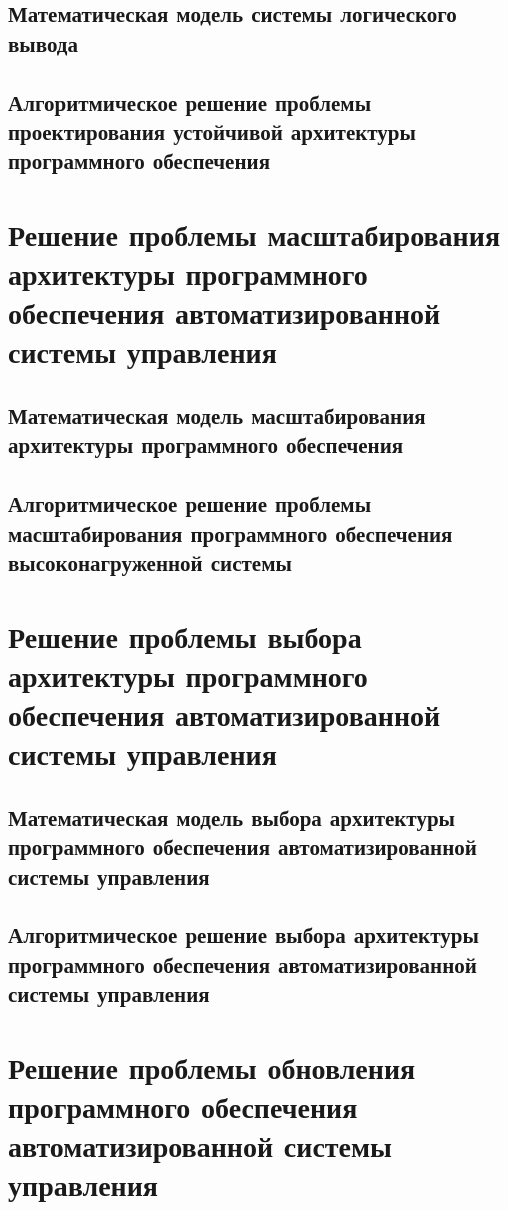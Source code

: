 
\subsection{Математическая модель системы логического вывода}\label{sec:ch2/sec3/sub1}

\subsection{Алгоритмическое решение проблемы проектирования устойчивой архитектуры программного обеспечения}\label{sec:ch2/sec3/sub2}
\section{Решение проблемы масштабирования архитектуры программного обеспечения автоматизированной системы управления}\label{sec:ch2/sec4}
\subsection{Математическая модель масштабирования архитектуры программного обеспечения}\label{sec:ch2/sec4/sub1}
\subsection{Алгоритмическое решение проблемы масштабирования программного обеспечения высоконагруженной системы}\label{sec:ch2/sec4/sub2}
\section{Решение проблемы выбора архитектуры программного обеспечения автоматизированной системы управления}\label{sec:ch2/sec5}
\subsection{Математическая модель выбора архитектуры программного обеспечения автоматизированной системы управления}\label{sec:ch2/sec5/sub1}
\subsection{Алгоритмическое решение выбора архитектуры программного обеспечения автоматизированной системы управления}\label{sec:ch2/sec5/sub2}
\section{Решение проблемы обновления программного обеспечения автоматизированной системы управления}\label{sec:ch2/sec6}
